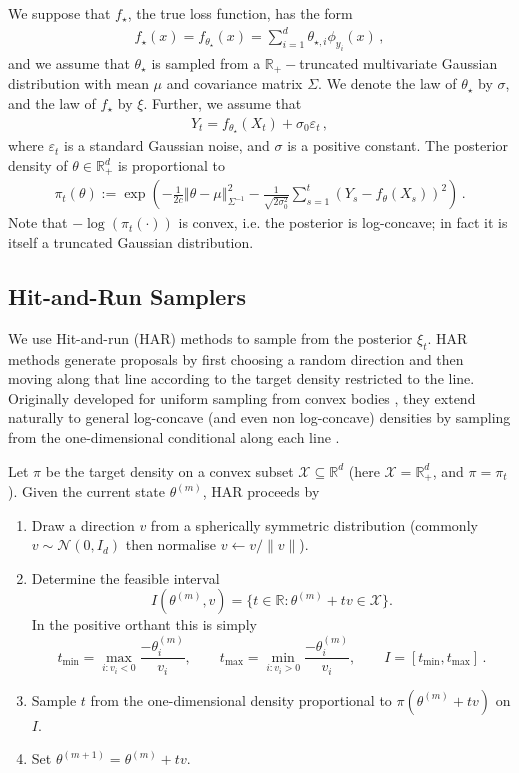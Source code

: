 \documentclass[letter, 12pt]{report}
\newcommand{\R}{\mathbb R}
\newcommand{\norm}[1]{\left \Vert  #1 \right \Vert}
\newcommand{\1}{\mathbf{1}}
\newcommand{\Normal}{\mathcal{N}}
\theoremstyle{plain}
\theoremstyle{definition}
\theoremstyle{remark}
\begin{document}
We suppose that $f_\star$, the true loss function, has the form
\begin{align}
    f_\star(x) = f_{\theta_\star}(x) = \sum_{i=1}^d \theta_{\star,i} \phi_{y_i}(x)\,,
\end{align}
and we assume that $\theta_\star$ is sampled from
a $\R_+-$truncated multivariate Gaussian distribution
with mean $\mu$ and covariance matrix $\Sigma$.
We denote the law of $\theta_\star$ by $\sigma$,
and the law of $f_\star$ by $\xi$.
Further, we assume that
\begin{align}
    Y_t = f_{\theta_\star}(X_t) + \sigma_0 \varepsilon_t\,,
\end{align}
where $\varepsilon_t$ is a standard Gaussian noise,
and $\sigma$ is a positive constant.
The posterior density of $\theta \in \R_+^d$ is proportional to
\begin{align*}
    \pi_t(\theta) := \exp\left(
    -\frac{1}{2c} \norm{\theta - \mu}^2_{\Sigma^{-1}} - \tfrac{1}{\sqrt{2\sigma_0^2}} \sum_{s=1}^t (Y_s - f_\theta(X_s))^2
    \right)\,.
\end{align*}
Note that $-\log\left(\pi_t(\cdot)\right)$ is convex, i.e. the posterior is log-concave;
in fact it is itself a truncated Gaussian distribution.

\subsection{Hit-and-Run Samplers}
\label{sec:hit-and-run}
We use Hit-and-run (HAR) methods to sample from the posterior $\xi_t$.
HAR methods generate proposals by first choosing a random direction and
then moving along that line according to the target density restricted to the line.
Originally developed for uniform sampling from convex bodies \citep[e.g.][]{smith1984efficient,lovasz1999hit}, they extend naturally to general log-concave (and even non log-concave) densities by sampling from the one-dimensional conditional along each line \citep{lovasz2007geometry}.

Let $\pi$ be the target density on a convex subset $\mathcal{X}\subseteq\R^d$ (here $\mathcal{X}=\R_+^d$, and $\pi = \pi_t$).
Given the current state $\theta^{(m)}$, HAR proceeds by
\begin{enumerate}
    \item Draw a direction $v$ from a spherically symmetric distribution (commonly $v \sim \Normal(0,I_d)$ then normalise $v\leftarrow v/\|v\|$).
    \item Determine the feasible interval
          \[
              I(\theta^{(m)},v) = \{ t\in\R : \theta^{(m)} + t v \in \mathcal{X}\}.
          \]
          In the positive orthant this is simply
          \[
              t_{\min} = \max_{i:v_i<0} \frac{-\theta^{(m)}_i}{v_i},\qquad
              t_{\max} = \min_{i:v_i>0} \frac{-\theta^{(m)}_i}{v_i},\qquad
              I=[t_{\min},t_{\max}]\,.
          \]
    \item Sample $t$ from the one-dimensional density proportional to $\pi(\theta^{(m)} + t v)$ on $I$.
    \item Set $\theta^{(m+1)} = \theta^{(m)} + t v$.
\end{enumerate}
\end{document}
